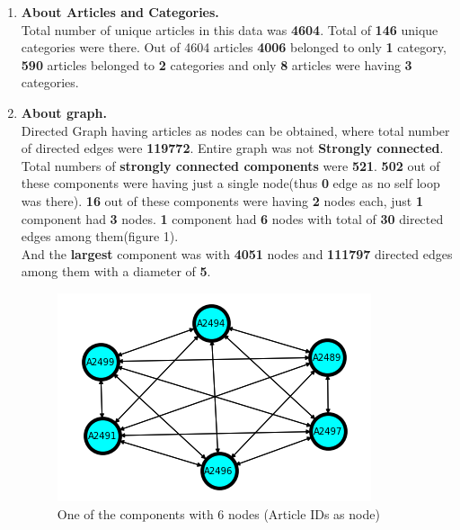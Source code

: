 \documentclass[12pt]{article}
\begin{document}
\begin{enumerate}

    \item \textbf{About Articles and Categories.}\\
    
    Total number of unique articles in this data was \textbf{4604}.
    Total of \textbf{146} unique categories were there.
    Out of  4604 articles \textbf{4006}  belonged to only \textbf{1} category, \textbf{590} articles belonged to \textbf{2} categories and only \textbf{8} articles were having \textbf{3} categories.
    
    \vspace{1cm}
    
    
    \item \textbf{About graph.}\\
    
    Directed Graph having articles as nodes can be obtained, where total number of directed edges were \textbf{119772}.
    Entire graph was not \textbf{Strongly connected}.
    Total numbers of \textbf{strongly connected components} were
    \textbf{521}.
    \textbf{502} out of these components were having just a single node(thus \textbf{0} edge as no self loop was there). \textbf{16} out of these components were having \textbf{2} nodes each, just \textbf{1} component had \textbf{3} nodes. \textbf{1} component had \textbf{6} nodes with total of \textbf{30} directed edges among them(figure 1).\\
    And the \textbf{largest} component was with \textbf{4051} nodes and \textbf{111797} directed edges among them with a diameter of \textbf{5}.
    
\begin{figure}[t]
\centering
\includegraphics[scale=1]{graph.png}
\caption{One of the components with 6 nodes (Article IDs as node) }
\end{figure}


\end{enumerate}
\end{document}
